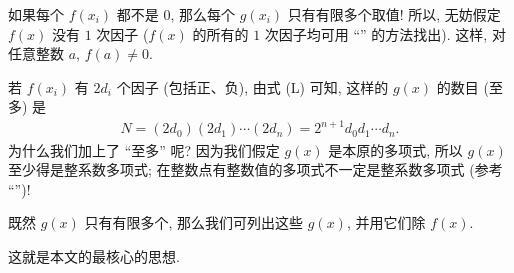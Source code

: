 如果每个 $f(x_i)$ 都不是 $0$, 那么每个 $g(x_i)$ 只有有限多个取值! 所以, 无妨假定 $f(x)$ 没有 $1$ 次因子 ($f(x)$ 的所有的 $1$ 次因子均可用 ``\RationalRootsOfPolynomialsOverQ '' 的方法找出). 这样, 对任意整数 $a$, $f(a) \neq 0$.

若 $f(x_i)$ 有 $2d_i$ 个因子 (包括正、负), 由式 (L) 可知, 这样的 $g(x)$ 的数目 (至多) 是
\begin{align*}
    N = (2d_0) (2d_1) \cdots (2d_n) = 2^{n+1} d_0 d_1 \cdots d_n.
\end{align*}
为什么我们加上了 ``至多'' 呢? 因为我们假定 $g(x)$ 是本原的多项式, 所以 $g(x)$ 至少得是整系数多项式; 在整数点有整数值的多项式不一定是整系数多项式 (参考 ``\GeneralizedBinomialCoefficients '')!

既然 $g(x)$ 只有有限多个, 那么我们可列出这些 $g(x)$, 并用它们除 $f(x)$.

这就是本文的最核心的思想.

